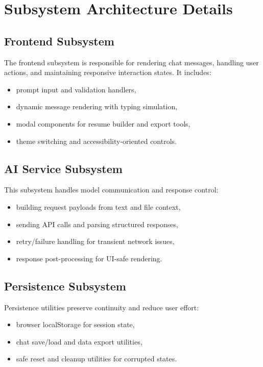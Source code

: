 \documentclass[12pt,a4paper]{report}
\begin{document}
\section{Subsystem Architecture Details}
\subsection{Frontend Subsystem}
The frontend subsystem is responsible for rendering chat messages, handling user actions, and maintaining responsive interaction states. It includes:
\begin{itemize}
  \item prompt input and validation handlers,
  \item dynamic message rendering with typing simulation,
  \item modal components for resume builder and export tools,
  \item theme switching and accessibility-oriented controls.
\end{itemize}

\subsection{AI Service Subsystem}
This subsystem handles model communication and response control:
\begin{itemize}
  \item building request payloads from text and file context,
  \item sending API calls and parsing structured responses,
  \item retry/failure handling for transient network issues,
  \item response post-processing for UI-safe rendering.
\end{itemize}

\subsection{Persistence Subsystem}
Persistence utilities preserve continuity and reduce user effort:
\begin{itemize}
  \item browser localStorage for session state,
  \item chat save/load and data export utilities,
  \item safe reset and cleanup utilities for corrupted states.
\end{itemize}
\end{document}
